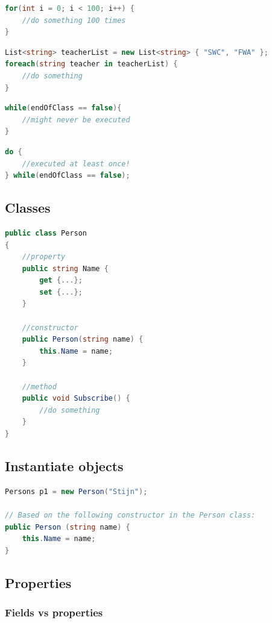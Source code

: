 \documentclass{article}
\begin{document}
\begin{lstlisting}[language=csharp]
for(int i = 0; i < 100; i++) {
    //do something 100 times
}
\end{lstlisting}

\begin{lstlisting}[language=csharp]
List<string> teacherList = new List<string> { "SWC", "FWA" };
foreach(string teacher in teacherList) {
    //do something
}
\end{lstlisting}

\begin{lstlisting}[language=csharp]
while(endOfClass == false){
    //might never be executed
}
\end{lstlisting}

\begin{lstlisting}[language=csharp]
do {
    //executed at least once!
} while(endOfClass == false);
\end{lstlisting}

\subsection{Classes}
\begin{lstlisting}[language=csharp]
public class Person
{
    //property
    public string Name { 
        get {...};
        set {...}; 
    }

    //constructor
    public Person(string name) {
        this.Name = name;
    }

    //method
    public void Subscribe() {
        //do something
    }
}
\end{lstlisting}

\subsection{Instantiate objects}

\begin{lstlisting}[language=csharp]
Persons p1 = new Person("Stijn");

// Based on the following constructor in the Person class:
public Person (string name) {
    this.Name = name;
}
\end{lstlisting}

\subsection{Properties}

\subsubsection{Fields vs properties}
\end{document}
